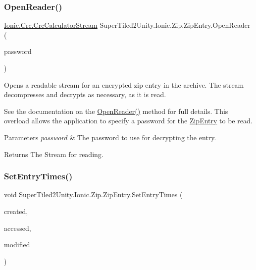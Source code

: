 \subsubsection{\texorpdfstring{Open\+Reader()}{OpenReader()}\hspace{0.1cm}{\footnotesize\ttfamily [2/2]}}
{\footnotesize\ttfamily \mbox{\hyperlink{class_super_tiled2_unity_1_1_ionic_1_1_crc_1_1_crc_calculator_stream}{Ionic.\+Crc.\+Crc\+Calculator\+Stream}} Super\+Tiled2\+Unity.\+Ionic.\+Zip.\+Zip\+Entry.\+Open\+Reader (\begin{DoxyParamCaption}\item[{string}]{password }\end{DoxyParamCaption})}



Opens a readable stream for an encrypted zip entry in the archive. The stream decompresses and decrypts as necessary, as it is read. 

See the documentation on the \mbox{\hyperlink{class_super_tiled2_unity_1_1_ionic_1_1_zip_1_1_zip_entry_a825692bb86f2c5da7eefc1e9714ae18c}{Open\+Reader()}} method for full details. This overload allows the application to specify a password for the {\ttfamily \mbox{\hyperlink{class_super_tiled2_unity_1_1_ionic_1_1_zip_1_1_zip_entry}{Zip\+Entry}}} to be read. 


\begin{DoxyParams}{Parameters}
{\em password} & The password to use for decrypting the entry.\\
\hline
\end{DoxyParams}
\begin{DoxyReturn}{Returns}
The Stream for reading.
\end{DoxyReturn}
\mbox{\label{class_super_tiled2_unity_1_1_ionic_1_1_zip_1_1_zip_entry_a7331ca69b05c476a9d321b30d7649766}} 
\subsubsection{\texorpdfstring{Set\+Entry\+Times()}{SetEntryTimes()}}
{\footnotesize\ttfamily void Super\+Tiled2\+Unity.\+Ionic.\+Zip.\+Zip\+Entry.\+Set\+Entry\+Times (\begin{DoxyParamCaption}\item[{Date\+Time}]{created,  }\item[{Date\+Time}]{accessed,  }\item[{Date\+Time}]{modified }\end{DoxyParamCaption})}



